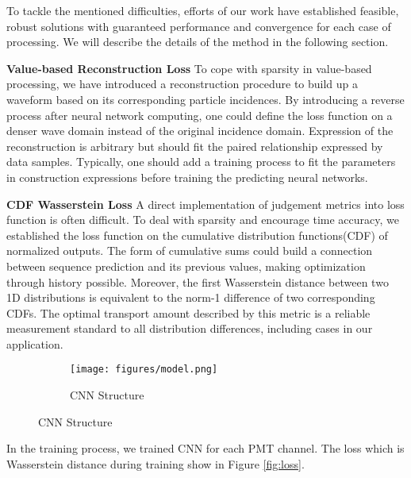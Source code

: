 To tackle the mentioned difficulties, efforts of our work have established feasible, robust solutions with guaranteed performance and convergence for each case of processing. We will describe the details of the method in the following section.

\textbf{Value-based Reconstruction Loss}
To cope with sparsity in value-based processing, we have introduced a reconstruction procedure to build up a waveform based on its corresponding particle incidences. By introducing a reverse process after neural network computing, one could define the loss function on a denser wave domain instead of the original incidence domain. Expression of the reconstruction is arbitrary but should fit the paired relationship expressed by data samples. Typically, one should add a training process to fit the parameters in construction expressions before training the predicting neural networks.

\textbf{CDF Wasserstein Loss}
A direct implementation of judgement metrics into loss function is often difficult. To deal with sparsity and encourage time accuracy, we established the loss function on the cumulative distribution functions(CDF) of normalized outputs. The form of cumulative sums could build a connection between sequence prediction and its previous values, making optimization through history possible. Moreover, the first Wasserstein distance between two 1D distributions is equivalent to the norm-1 difference of two corresponding CDFs. The optimal transport amount described by this metric is a reliable measurement standard to all distribution differences, including cases in our application.

\begin{figure}[H]
\begin{minipage}{.3\textwidth}
\begin{figure}[H]
    \centering
    \caption{CNN Structure}
    \texttt{[image: figures/model.png]}
    \label{fig:struct}
\end{figure}
\end{minipage}
\hspace{4mm}
\begin{minipage}{.7\textwidth}

\end{minipage}
\end{figure}

In the training process, we trained CNN for each PMT channel. The loss which is Wasserstein distance during training show in Figure \ref{fig:loss}. 

